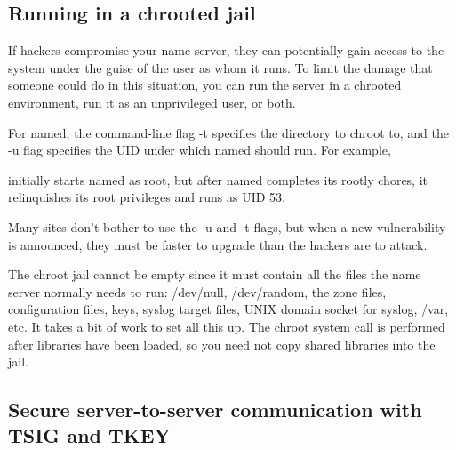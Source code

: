 \protect\hypertarget{part0024_split_056.html}{}{}

\hypertarget{part0024_split_056.htmlux5cux23_idContainer1069}{}
\hypertarget{part0024_split_056.htmlux5cux23calibre_pb_55}{%
\subsection[Running in a {chroot}ed
jail]{\texorpdfstring{\protect\hypertarget{part0024_split_056.htmlux5cux23_idTextAnchor935}{}{}Running
in a {chroot}ed
jail}{Running in a chrooted jail}}\label{part0024_split_056.htmlux5cux23calibre_pb_55}}

\protect\hypertarget{part0024_split_056.htmlux5cux23_idIndexMarker2244}{}{}If
hackers compromise your name server, they can potentially gain access to
the system under the guise of the user as whom it runs. To limit the
damage that someone could do in this situation, you can run the server
in a {chroot}ed environment, run it as an unprivileged user, or both.

For {named}, the command-line flag {-t} specifies the directory to
{chroot} to, and the {-u} flag specifies the UID under which {named}
should run. For example,


initially starts {named} as root, but after {named} completes its rootly
chores, it relinquishes its root privileges and runs as UID 53.

Many sites don't bother to use the {-u} and {-t} flags, but when a new
vulnerability is announced, they must be faster to upgrade than the
hackers are to attack.

The {chroot} jail cannot be empty since it must contain all the files
the name server normally needs to run: {/dev/null}, {/dev/random}, the
zone files, configuration files, keys, syslog target files, UNIX domain
socket for syslog, {/var}, etc. It takes a bit of work to set all this
up. The {chroot} system call is performed after libraries have been
loaded, so you need not copy shared libraries into the jail.

\protect\hypertarget{part0024_split_057.html}{}{}

\hypertarget{part0024_split_057.htmlux5cux23_idContainer1069}{}
\hypertarget{part0024_split_057.htmlux5cux23calibre_pb_56}{%
\subsection[Secure server-to-server communication with TSIG and
TKEY]{\texorpdfstring{\protect\hypertarget{part0024_split_057.htmlux5cux23_idTextAnchor936}{}{}Secure
server-to-server communication with TSIG and
TKEY}{Secure server-to-server communication with TSIG and TKEY}}\label{part0024_split_057.htmlux5cux23calibre_pb_56}}

